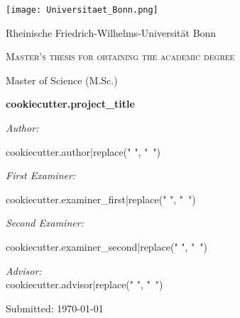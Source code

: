 \begin{titlepage}
	\centering
     
    \texttt{[image: Universitaet\_Bonn.png]}\par
    \vspace{0.7cm}
	{\textsc\LARGE Rheinische Friedrich-Wilhelms-Universität Bonn}\par
	\vspace{1.2cm}
	{\scshape Master's thesis for obtaining the academic degree \par\glqq Master of Science (M.Sc.)\grqq  \par}
	\vspace{2cm}
	
	{\Large\bfseries {{cookiecutter.project_title}} }\par
	\vspace{1.4cm}
	
	\noindent
    \begin{minipage}[t]{0.4\textwidth}
        \begin{flushleft} \large
            \emph{Author:}\par
            {{cookiecutter.author|replace(" ", "~")}}
        \end{flushleft}        
    \end{minipage}    
    \begin{minipage}[t]{0.5\textwidth}
        \begin{flushright} \large
            \emph{First Examiner:}\par
            {{cookiecutter.examiner_first|replace(" ", "~")}}\par\vspace{0.5cm}
            
            \emph{Second Examiner:}\par
            {{cookiecutter.examiner_second|replace(" ", "~")}}\par\vspace{0.5cm}

            \emph{Advisor:} \\
            {{cookiecutter.advisor|replace(" ", "~")}}\par\vspace{0.5cm}
        \end{flushright}
    \end{minipage}

    \vfill
	
    {\large Submitted:\hspace{1cm} \today}
\end{titlepage}
